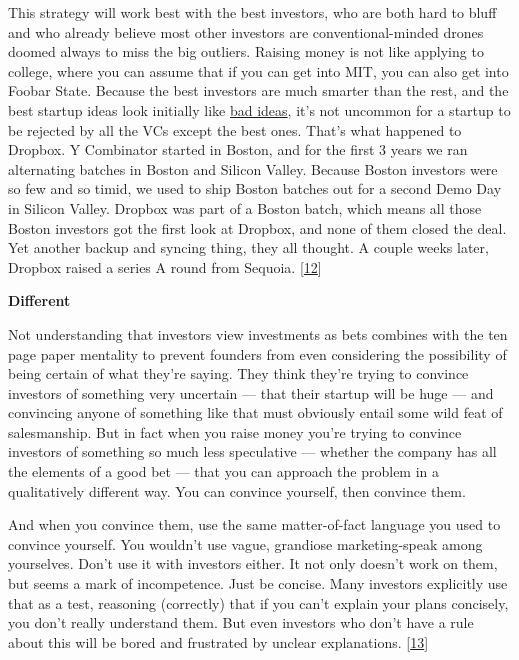 This strategy will work best with the best
                  investors, who are both hard to bluff and who already believe
                  most other investors are conventional-minded drones doomed
                  always to miss the big outliers. Raising money is not like
                  applying to college, where you can assume that if you can get
                  into MIT, you can also get into Foobar State. Because the best
                  investors are much smarter than the rest, and the best startup
                  ideas look initially like
                  \href{http://www.paulgraham.com/startupideas.html}{bad ideas}, it's not uncommon
                  for a startup to be rejected by all the VCs except the best
                  ones. That's what happened to Dropbox. Y Combinator started in
                  Boston, and for the first 3 years we ran alternating batches
                  in Boston and Silicon Valley. Because Boston investors were so
                  few and so timid, we used to ship Boston batches out for a
                  second Demo Day in Silicon Valley. Dropbox was part of a
                  Boston batch, which means all those Boston investors got the
                  first look at Dropbox, and none of them closed the deal. Yet
                  another backup and syncing thing, they all thought. A couple
                  weeks later, Dropbox raised a series A round from Sequoia.
                  [\href{\#f12n}{12}]

\textbf{Different}

Not understanding
                  that investors view investments as bets combines with the ten
                  page paper mentality to prevent founders from even considering
                  the possibility of being certain of what they're saying. They
                  think they're trying to convince investors of something very
                  uncertain --- that their startup will be huge --- and
                  convincing anyone of something like that must obviously entail
                  some wild feat of salesmanship. But in fact when you raise
                  money you're trying to convince investors of something so much
                  less speculative --- whether the company has all the
                  elements of a good bet --- that you can approach the
                  problem in a qualitatively different way. You can convince
                  yourself, then convince them.

And when you convince
                  them, use the same matter-of-fact language you used to
                  convince yourself. You wouldn't use vague, grandiose
                  marketing-speak among yourselves. Don't use it with investors
                  either. It not only doesn't work on them, but seems a mark of
                  incompetence. Just be concise. Many investors explicitly use
                  that as a test, reasoning (correctly) that if you can't
                  explain your plans concisely, you don't really understand
                  them. But even investors who don't have a rule about this will
                  be bored and frustrated by unclear explanations.
                  [\href{\#f13n}{13}]

